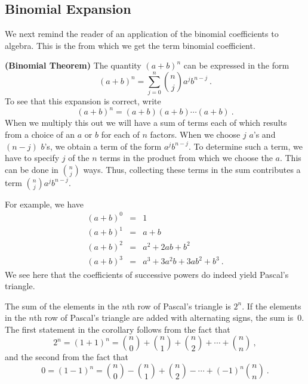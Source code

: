 
\subsection*{Binomial Expansion}

We next remind the reader of an application of the binomial coefficients to algebra. 
This is the  from which we get the term binomial coefficient.
\begin{theorem}\label{thm 3.9}{\bf (Binomial Theorem)} The quantity $(a +
b)^n$ can be expressed in the form
$$ (a + b)^n = \sum_{j = 0}^n {n \choose j} a^j b^{n - j}\ .
$$
\proof To see that this expansion is correct, write
$$ (a + b)^n = (a + b)(a + b) \cdots (a + b)\ .
$$ When we multiply this out we will have a sum of terms each of which results from
a choice of an $a$ or $b$ for each of $n$ factors.  When we choose $j$
$a$'s and $(n - j)$ $b$'s, 
we obtain a term of the form $a^j b^{n - j}$.  To determine
such a term, we have to specify
$j$ of the $n$ terms in the product from which we
choose the $a$.  This can be done in $n \choose j$ ways.   Thus, collecting these
terms in the sum contributes a term ${n \choose j} a^j b^{n - j}$.
\end{theorem}
\par
For example, we have
\begin{eqnarray*} (a + b)^0 & = & 1 \\ (a + b)^1 & = & a + b \\ (a + b)^2 & = & a^2 +
2ab + b^2 \\ (a + b)^3 & = & a^3 + 3a^2b + 3ab^2 + b^3\ .
\end{eqnarray*}
We see here that the coefficients of successive powers do indeed yield Pascal's triangle.

\begin{corollary}\label{cor 3.1}  The sum of the elements in the $n$th row of
Pascal's triangle is $2^n$.  If the elements in the $n$th row of Pascal's triangle
are added with alternating signs, the sum is~0.
\proof The first statement in the corollary follows from the fact that
$$ 2^n = (1 + 1)^n = {n \choose 0} + {n \choose 1} + {n \choose 2} + \cdots + {n
\choose n}\ ,
$$ and the second from the fact that
$$ 0 = (1 - 1)^n = {n \choose 0} - {n \choose 1} + {n \choose 2}- \cdots + {(-1)^n}{n
\choose n}\ .
$$
\end{corollary}

